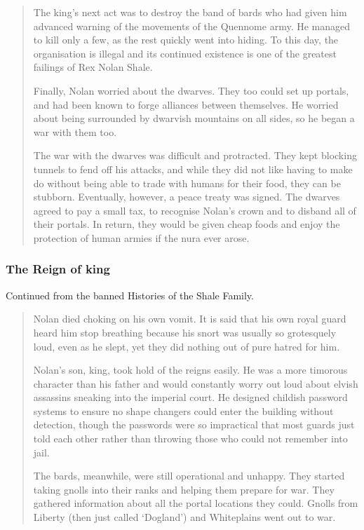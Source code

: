 \begin{multicols}{2}
\begin{quotation}
	The king's next act was to destroy the band of bards who had given him advanced warning of the movements of the Quennome army.
	He managed to kill only a few, as the rest quickly went into hiding.
	To this day, the organisation is illegal and its continued existence is one of the greatest failings of Rex Nolan Shale.

	Finally, Nolan worried about the dwarves.
	They too could set up portals, and had been known to forge alliances between themselves.
	He worried about being surrounded by dwarvish mountains on all sides, so he began a war with them too.

	The war with the dwarves was difficult and protracted.
	They kept blocking tunnels to fend off his attacks, and while they did not like having to make do without being able to trade with humans for their food, they can be stubborn.
	Eventually, however, a peace treaty was signed.
	The dwarves agreed to pay a small tax, to recognise Nolan's crown and to disband all of their portals.
	In return, they would be given cheap foods and enjoy the protection of human armies if the nura ever arose.

\end{quotation}

\subsubsection{The Reign of \gls{king}}

Continued from the banned Histories of the Shale Family.

\begin{quotation}

	Nolan died choking on his own vomit.
	It is said that his own royal guard heard him stop breathing because his snort was usually so grotesquely loud, even as he slept, yet they did nothing out of pure hatred for him.

	Nolan's son, \gls{king}, took hold of the reigns easily.
	He was a more timorous character than his father and would constantly worry out loud about elvish assassins sneaking into the imperial court.
	He designed childish password systems to ensure no shape changers could enter the building without detection, though the passwords were so impractical that most guards just told each other rather than throwing those who could not remember into jail.

	The bards, meanwhile, were still operational and unhappy.
	They started taking gnolls into their ranks and helping them prepare for war.
	They gathered information about all the portal locations they could.
	Gnolls from Liberty (then just called `Dogland') and Whiteplains went out to war.


\end{quotation}
\end{multicols}

